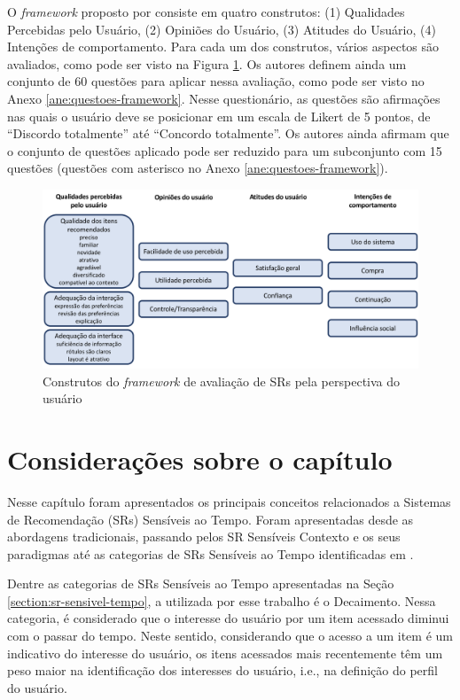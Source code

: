 O \textit{framework} proposto por  consiste em quatro construtos: (1) Qualidades Percebidas pelo
Usuário, (2) Opiniões do Usuário, (3) Atitudes do Usuário, (4) Intenções de comportamento.
Para cada um dos construtos, vários aspectos são avaliados, como pode ser visto na Figura \ref{fig:resque-framework}.
Os autores definem ainda um conjunto de 60 questões para aplicar nessa avaliação, como pode ser visto no Anexo
\ref{ane:questoes-framework}. Nesse questionário, as questões são afirmações nas quais o usuário deve se posicionar em
um escala de Likert de 5 pontos, de ``Discordo totalmente'' até ``Concordo totalmente''. Os autores ainda afirmam que o
conjunto de questões aplicado pode ser reduzido para um subconjunto com 15 questões (questões com asterisco no Anexo
\ref{ane:questoes-framework}).

\begin{figure}[htb]
  \caption{\label{fig:resque-framework}Construtos do \textit{framework} de avaliação de SRs pela perspectiva do usuário}
  \begin{center}
      \includegraphics[scale=0.4]{./Figuras/resque-framework-traduzido.png}
  \end{center}
\end{figure}

\section{Considerações sobre o capítulo}

Nesse capítulo foram apresentados os principais conceitos relacionados a Sistemas de Recomendação (SRs) Sensíveis ao Tempo.
Foram apresentadas desde as abordagens tradicionais, passando pelos SR Sensíveis Contexto e os seus paradigmas até as
categorias de SRs Sensíveis ao Tempo identificadas em .

Dentre as categorias de SRs Sensíveis ao Tempo apresentadas na Seção \ref{section:sr-sensivel-tempo}, a utilizada por esse
trabalho é o Decaimento. Nessa categoria, é considerado que o interesse do usuário por um item acessado diminui com o passar
do tempo. Neste sentido, considerando que o acesso a um item é um indicativo do interesse do usuário, os itens acessados
mais recentemente têm um peso maior na identificação dos interesses do usuário, i.e., na definição do perfil do usuário.

